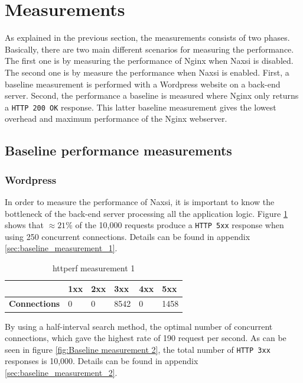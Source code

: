 \documentclass[Measurements]{subfiles}
\begin{document}
\section{Measurements}

\label{sec:Measurements}

As explained in the previous section, the measurements consists of two phases.
Basically, there are two main different scenarios for measuring the performance. The first one is by measuring the performance of Nginx when Naxsi is disabled. The second one is by measure the performance when Naxsi is enabled.  First, a baseline measurement is performed with a Wordpress website on a back-end server. Second, the performance a baseline is measured where Nginx only returns a \verb+HTTP 200 OK+ response. This latter baseline measurement gives the lowest overhead and maximum performance of the Nginx webserver.

\subsection{Baseline performance measurements}

\subsubsection{Wordpress}
\label{sec:Baseline performance measurement}
In order to measure the performance of Naxsi, it is important to know the bottleneck of the back-end server processing all the application logic. Figure \ref{fig:Baseline measurement 1} shows that $\approx 21\%$ of the 10,000 requests produce a \verb+HTTP 5xx+ response when using 250 concurrent connections. Details can be found in appendix \ref{sec:baseline_measurement_1}.

\begin{table}[H]
\caption{httperf measurement 1}
\begin{tabular}{|p{2cm}|p{}|p{}|p{}|p{}|p{}|}
\hline
 & \textbf{1xx} & \textbf{2xx} & \textbf{3xx} & \textbf{4xx} & \textbf{5xx} \\ \hline
\textbf{Connections} & 0 & 0 & 8542 & 0 & 1458 \\ \hline
\end{tabular}
\label{fig:Baseline measurement 1}
\end{table}

By using a half-interval search method, the optimal number of concurrent connections, which gave the highest rate of 190 request per second. As can be seen in figure \ref{fig:Baseline measurement 2}, the total number of \verb+HTTP 3xx+ responses is 10,000. Details can be found in appendix \ref{sec:baseline_measurement_2}.
\end{document}
